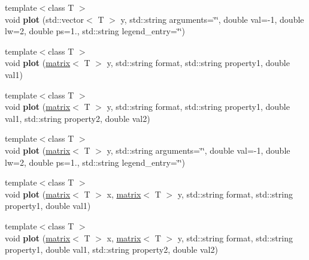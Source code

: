 \begin{DoxyCompactItemize}
\item 
\hypertarget{classkeycpp_1_1_figure_a3646790552f73645bf926b1678fede40}{{\footnotesize template$<$class T $>$ }\\void {\bfseries plot} (std\-::vector$<$ T $>$ y, std\-::string arguments=\char`\"{}\char`\"{}, double val=-\/1, double lw=2, double ps=1., std\-::string legend\-\_\-entry=\char`\"{}\char`\"{})}\label{classkeycpp_1_1_figure_a3646790552f73645bf926b1678fede40}

\item 
\hypertarget{classkeycpp_1_1_figure_a88e55b3a2c1b05c7c7fe2e6785e11f58}{{\footnotesize template$<$class T $>$ }\\void {\bfseries plot} (\hyperlink{classkeycpp_1_1matrix}{matrix}$<$ T $>$ y, std\-::string format, std\-::string property1, double val1)}\label{classkeycpp_1_1_figure_a88e55b3a2c1b05c7c7fe2e6785e11f58}

\item 
\hypertarget{classkeycpp_1_1_figure_a2e6daf7811c3d34fabb83bc8368e1e7c}{{\footnotesize template$<$class T $>$ }\\void {\bfseries plot} (\hyperlink{classkeycpp_1_1matrix}{matrix}$<$ T $>$ y, std\-::string format, std\-::string property1, double val1, std\-::string property2, double val2)}\label{classkeycpp_1_1_figure_a2e6daf7811c3d34fabb83bc8368e1e7c}

\item 
\hypertarget{classkeycpp_1_1_figure_a39dd5e2d5e6acb6db99ac75476ea777a}{{\footnotesize template$<$class T $>$ }\\void {\bfseries plot} (\hyperlink{classkeycpp_1_1matrix}{matrix}$<$ T $>$ y, std\-::string arguments=\char`\"{}\char`\"{}, double val=-\/1, double lw=2, double ps=1., std\-::string legend\-\_\-entry=\char`\"{}\char`\"{})}\label{classkeycpp_1_1_figure_a39dd5e2d5e6acb6db99ac75476ea777a}

\item 
\hypertarget{classkeycpp_1_1_figure_a35987b305f55c3b8c612fbaec2223060}{{\footnotesize template$<$class T $>$ }\\void {\bfseries plot} (\hyperlink{classkeycpp_1_1matrix}{matrix}$<$ T $>$ x, \hyperlink{classkeycpp_1_1matrix}{matrix}$<$ T $>$ y, std\-::string format, std\-::string property1, double val1)}\label{classkeycpp_1_1_figure_a35987b305f55c3b8c612fbaec2223060}

\item 
\hypertarget{classkeycpp_1_1_figure_a9000f7c76f21a37d4c70bee3103fe623}{{\footnotesize template$<$class T $>$ }\\void {\bfseries plot} (\hyperlink{classkeycpp_1_1matrix}{matrix}$<$ T $>$ x, \hyperlink{classkeycpp_1_1matrix}{matrix}$<$ T $>$ y, std\-::string format, std\-::string property1, double val1, std\-::string property2, double val2)}\label{classkeycpp_1_1_figure_a9000f7c76f21a37d4c70bee3103fe623}


\end{DoxyCompactItemize}
